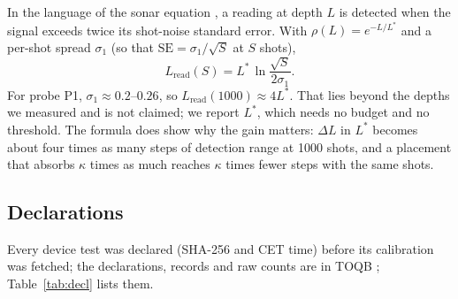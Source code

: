 \documentclass[11pt]{article}
\begin{document}
In the language of the sonar equation \cite{urick1983}, a reading at depth $L$ is detected when the signal exceeds
twice its shot-noise standard error. With $\rho(L)=e^{-L/L^*}$ and a per-shot spread $\sigma_1$ (so that
$\mathrm{SE}=\sigma_1/\sqrt{S}$ at $S$ shots),
\[
L_{\mathrm{read}}(S)=L^*\,\ln\frac{\sqrt{S}}{2\sigma_1}.
\]
For probe P1, $\sigma_1\approx0.2$--$0.26$, so $L_{\mathrm{read}}(1000)\approx4L^*$. That lies beyond the depths we
measured and is not claimed; we report $L^*$, which needs no budget and no threshold. The formula does show why the
gain matters: $\Delta L$ in $L^*$ becomes about four times as many steps of detection range at 1000 shots, and a
placement that absorbs $\kappa$ times as much reaches $\kappa$ times fewer steps with the same shots.

\subsection{Declarations}
Every device test was declared (SHA-256 and CET time) before its calibration was fetched; the declarations, records
and raw counts are in TOQB \cite{toqb}; Table~\ref{tab:decl} lists them.
\end{document}
